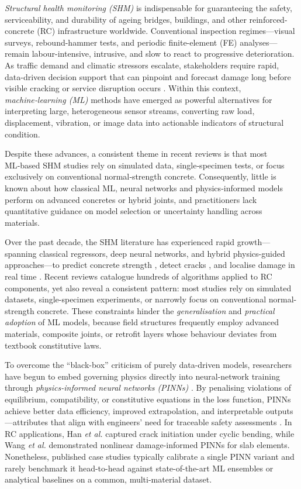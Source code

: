 \documentclass{article}
\begin{document}
\emph{Structural health monitoring (SHM)} is indispensable for guaranteeing the safety, serviceability, and durability of ageing bridges, buildings, and other reinforced-concrete (RC) infrastructure worldwide.  Conventional inspection regimes—visual surveys, rebound-hammer tests, and periodic finite-element (FE) analyses—remain labour-intensive, intrusive, and slow to react to progressive deterioration.  As traffic demand and climatic stressors escalate, stakeholders require rapid, data-driven decision support that can pinpoint and forecast damage long before visible cracking or service disruption occurs \cite{Farrar2012Review,Masri2021Emerging}.  Within this context, \emph{machine‑learning (ML)} methods have emerged as powerful alternatives for interpreting large, heterogeneous sensor streams, converting raw load, displacement, vibration, or image data into actionable indicators of structural condition.

Despite these advances, a consistent theme in recent reviews is that most ML‑based SHM studies rely on simulated data, single‑specimen tests, or focus exclusively on conventional normal‑strength concrete.  Consequently, little is known about how classical ML, neural networks and physics‑informed models perform on advanced concretes or hybrid joints, and practitioners lack quantitative guidance on model selection or uncertainty handling across materials.

Over the past decade, the SHM literature has experienced rapid growth—spanning classical regressors, deep neural networks, and hybrid physics-guided approaches—to predict concrete strength \cite{Kashyap2022Concrete}, detect cracks \cite{Zhu2020CrackDL}, and localise damage in real time \cite{Sun2022DeepSHM}.  Recent reviews catalogue hundreds of algorithms applied to RC components, yet also reveal a consistent pattern: most studies rely on simulated datasets, single-specimen experiments, or narrowly focus on conventional normal-strength concrete.  These constraints hinder the \emph{generalisation} and \emph{practical adoption} of ML models, because field structures frequently employ advanced materials, composite joints, or retrofit layers whose behaviour deviates from textbook constitutive laws.

To overcome the “black-box” criticism of purely data-driven models, researchers have begun to embed governing physics directly into neural-network training through \emph{physics-informed neural networks (PINNs)}  \cite{raissi2019physics}.  By penalising violations of equilibrium, compatibility, or constitutive equations in the loss function, PINNs achieve better data efficiency, improved extrapolation, and interpretable outputs—attributes that align with engineers’ need for traceable safety assessments \cite{Karniadakis2023PIML,Cuomo2022}.  In RC applications, Han \textit{et al.} \cite{Han2025CrackPINN} captured crack initiation under cyclic bending, while Wang \textit{et al.} \cite{Wang2024DamagePINN} demonstrated nonlinear damage-informed PINNs for slab elements.  Nonetheless, published case studies typically calibrate a single PINN variant and rarely benchmark it head-to-head against state-of-the-art ML ensembles or analytical baselines on a common, multi-material dataset.
\end{document}
